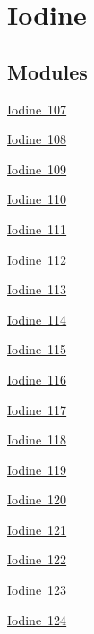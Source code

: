 \hypertarget{group___isotope_const-_iodine}{}\section{Iodine}
\label{group___isotope_const-_iodine}
\subsection*{Modules}
\begin{DoxyCompactItemize}
\item 
\mbox{\hyperlink{group___isotope_const-_iodine-_i107}{Iodine 107}}
\item 
\mbox{\hyperlink{group___isotope_const-_iodine-_i108}{Iodine 108}}
\item 
\mbox{\hyperlink{group___isotope_const-_iodine-_i109}{Iodine 109}}
\item 
\mbox{\hyperlink{group___isotope_const-_iodine-_i110}{Iodine 110}}
\item 
\mbox{\hyperlink{group___isotope_const-_iodine-_i111}{Iodine 111}}
\item 
\mbox{\hyperlink{group___isotope_const-_iodine-_i112}{Iodine 112}}
\item 
\mbox{\hyperlink{group___isotope_const-_iodine-_i113}{Iodine 113}}
\item 
\mbox{\hyperlink{group___isotope_const-_iodine-_i114}{Iodine 114}}
\item 
\mbox{\hyperlink{group___isotope_const-_iodine-_i115}{Iodine 115}}
\item 
\mbox{\hyperlink{group___isotope_const-_iodine-_i116}{Iodine 116}}
\item 
\mbox{\hyperlink{group___isotope_const-_iodine-_i117}{Iodine 117}}
\item 
\mbox{\hyperlink{group___isotope_const-_iodine-_i118}{Iodine 118}}
\item 
\mbox{\hyperlink{group___isotope_const-_iodine-_i119}{Iodine 119}}
\item 
\mbox{\hyperlink{group___isotope_const-_iodine-_i120}{Iodine 120}}
\item 
\mbox{\hyperlink{group___isotope_const-_iodine-_i121}{Iodine 121}}
\item 
\mbox{\hyperlink{group___isotope_const-_iodine-_i122}{Iodine 122}}
\item 
\mbox{\hyperlink{group___isotope_const-_iodine-_i123}{Iodine 123}}
\item 
\mbox{\hyperlink{group___isotope_const-_iodine-_i124}{Iodine 124}}
\item 

\end{DoxyCompactItemize}
